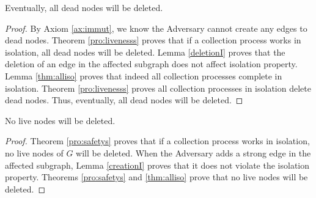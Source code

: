\begin{theorem}[Liveness]
Eventually, all dead nodes will be deleted.
\label{liveness}
\end{theorem}
\begin{proof}
By Axiom \ref{ax:immut}, we know the Adversary cannot create any
edges to dead nodes.
Theorem \ref{pro:livenesss} proves that if a  collection process
works in isolation, all dead nodes will be deleted.
Lemma \ref{deletionI} proves that the deletion of an edge in the
affected subgraph does not affect isolation property.
Lemma \ref{thm:alliso} proves that indeed all collection processes
complete in isolation. Theorem \ref{pro:livenesss} proves all collection
processes in isolation delete dead nodes. Thus, eventually, all dead nodes will be deleted.
%
\end{proof}

\begin{theorem}[Safety]
 No live nodes will be deleted.
\label{safety}
\end{theorem}
\begin{proof}
Theorem \ref{pro:safetys} proves that if a  collection process
works in isolation, no live nodes of $G$ will be deleted. When the Adversary adds a strong edge in the affected subgraph, Lemma
\ref{creationI} proves that it does not violate the isolation
property. Theorems \ref{pro:safetys} and \ref{thm:alliso} prove that no live nodes will be deleted.
\end{proof}





